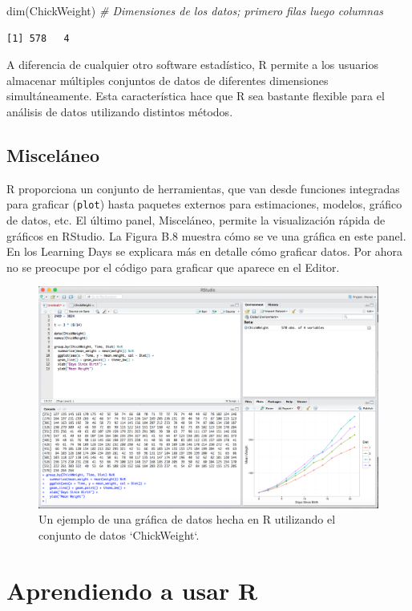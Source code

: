 \documentclass[
  12pt,
  spanish,
]{book}
\newenvironment{Shaded}{\begin{snugshade}}{\end{snugshade}}
\newcommand{\CommentTok}[1]{\textcolor[rgb]{0.56,0.35,0.01}{\textit{#1}}}
\newcommand{\FunctionTok}[1]{\textcolor[rgb]{0.00,0.00,0.00}{#1}}
\newcommand{\NormalTok}[1]{#1}
\begin{document}
\begin{Shaded}
\begin{Highlighting}[]
\FunctionTok{dim}\NormalTok{(ChickWeight) }\CommentTok{\# Dimensiones de los datos; primero filas luego columnas}
\end{Highlighting}
\end{Shaded}

\begin{verbatim}
[1] 578   4
\end{verbatim}

A diferencia de cualquier otro software estadístico, R permite a los usuarios almacenar múltiples conjuntos de datos de diferentes dimensiones simultáneamente. Esta característica hace que R sea bastante flexible para el análisis de datos utilizando distintos métodos.

\hypertarget{misceluxe1neo}{%
\subsection{Misceláneo}\label{misceluxe1neo}}

R proporciona un conjunto de herramientas, que van desde funciones integradas para graficar (\texttt{plot}) hasta paquetes externos para estimaciones, modelos, gráfico de datos, etc. El último panel, Misceláneo, permite la visualización rápida de gráficos en RStudio. La Figura B.8 muestra cómo se ve una gráfica en este panel. En los Learning Days se explicara más en detalle cómo graficar datos. Por ahora no se preocupe por el código para graficar que aparece en el Editor.

\begin{figure}
\includegraphics[width=0.6\linewidth]{Images/graph} \caption{Un ejemplo de una gráfica de datos hecha en R utilizando el conjunto de datos `ChickWeight`.}\label{fig:graph}
\end{figure}

\hypertarget{aprendiendo-a-usar-r}{%
\section{Aprendiendo a usar R}\label{aprendiendo-a-usar-r}}
\end{document}
